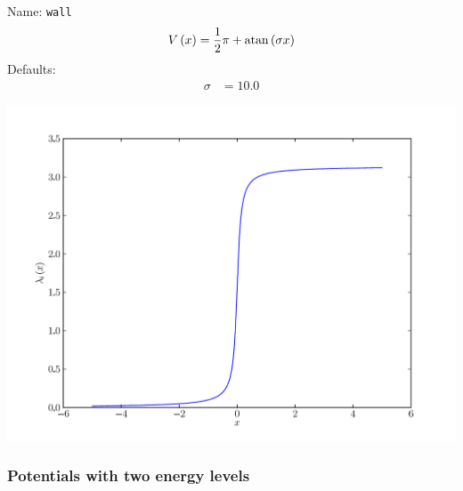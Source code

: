 \documentclass[a4paper,10pt]{report}
\begin{document}
\begin{minipage}{0.5\linewidth}
  Name:    \texttt{wall}
  \begin{equation*}
    V\left( x \right) = \frac{1}{2} \pi + \operatorname{atan}\left(\sigma x\right)
  \end{equation*}
  Defaults:
  \begin{align*}
    \sigma & = 10.0
  \end{align*}
\end{minipage}
\begin{minipage}{0.5\linewidth}
  \begin{center}
    \includegraphics[scale=0.25]{./fig/wall.pdf}
  \end{center}
\end{minipage}


\subsubsection{Potentials with two energy levels}
\end{document}
